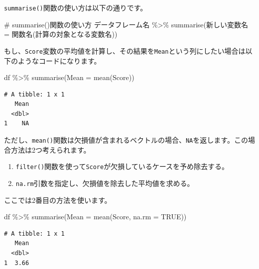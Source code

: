 \documentclass[
  a4paper,
  pandoc,
  ja=standard,
  jafont=haranoaji]{bxjsbook}
\newenvironment{Shaded}{\begin{snugshade}}{\end{snugshade}}
\newcommand{\AttributeTok}[1]{\textcolor[rgb]{0.00,0.48,0.65}{#1}}
\newcommand{\CommentTok}[1]{\textcolor[rgb]{0.37,0.37,0.37}{#1}}
\newcommand{\ConstantTok}[1]{\textcolor[rgb]{0.56,0.35,0.01}{#1}}
\newcommand{\FunctionTok}[1]{\textcolor[rgb]{0.28,0.35,0.67}{#1}}
\newcommand{\NormalTok}[1]{\textcolor[rgb]{0.00,0.48,0.65}{#1}}
\newcommand{\OtherTok}[1]{\textcolor[rgb]{0.00,0.48,0.65}{#1}}
\newcommand{\SpecialCharTok}[1]{\textcolor[rgb]{0.37,0.37,0.37}{#1}}
\providecommand{\tightlist}{%
  \setlength{\itemsep}{0pt}\setlength{\parskip}{0pt}}
\begin{document}
\texttt{summarise()}関数の使い方は以下の通りです。

\begin{Shaded}
\begin{Highlighting}[numbers=left,,]
\CommentTok{\# summarise()関数の使い方}
\NormalTok{データフレーム名 }\SpecialCharTok{\%\textgreater{}\%}
  \FunctionTok{summarise}\NormalTok{(新しい変数名 }\OtherTok{=}\NormalTok{ 関数名(計算の対象となる変数名))}
\end{Highlighting}
\end{Shaded}

もし、\texttt{Score}変数の平均値を計算し、その結果を\texttt{Mean}という列にしたい場合は以下のようなコードになります。

\begin{Shaded}
\begin{Highlighting}[numbers=left,,]
\NormalTok{df }\SpecialCharTok{\%\textgreater{}\%}
  \FunctionTok{summarise}\NormalTok{(}\AttributeTok{Mean =} \FunctionTok{mean}\NormalTok{(Score))}
\end{Highlighting}
\end{Shaded}

\begin{verbatim}
# A tibble: 1 x 1
   Mean
  <dbl>
1    NA
\end{verbatim}

ただし、\texttt{mean()}関数は欠損値が含まれるベクトルの場合、\texttt{NA}を返します。この場合方法は2つ考えられます。

\begin{enumerate}
\def\labelenumi{\arabic{enumi}.}
\tightlist
\item
  \texttt{filter()}関数を使って\texttt{Score}が欠損しているケースを予め除去する。
\item
  \texttt{na.rm}引数を指定し、欠損値を除去した平均値を求める。
\end{enumerate}

ここでは2番目の方法を使います。

\begin{Shaded}
\begin{Highlighting}[numbers=left,,]
\NormalTok{df }\SpecialCharTok{\%\textgreater{}\%}
  \FunctionTok{summarise}\NormalTok{(}\AttributeTok{Mean =} \FunctionTok{mean}\NormalTok{(Score, }\AttributeTok{na.rm =} \ConstantTok{TRUE}\NormalTok{))}
\end{Highlighting}
\end{Shaded}

\begin{verbatim}
# A tibble: 1 x 1
   Mean
  <dbl>
1  3.66
\end{verbatim}
\end{document}
